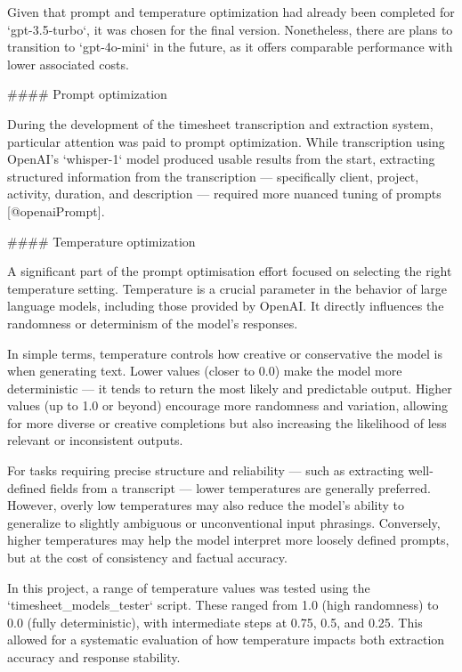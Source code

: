 \documentclass[
  digital,     %
  oneside,     %
  nosansbold,  %
  nocolorbold, %
  lof,         %
  lot,         %
]{fithesis4}
\begin{document}
\shorthandoff{-}
\begin{markdown}

Given that prompt and temperature optimization had already been completed for `gpt-3.5-turbo`, it was chosen for the final version. Nonetheless, there are plans to transition to `gpt-4o-mini` in the future, as it offers comparable performance with lower associated costs.

#### Prompt optimization

During the development of the timesheet transcription and extraction system, particular attention was paid to prompt optimization. While transcription using OpenAI's `whisper-1` model produced usable results from the start, extracting structured information from the transcription — specifically client, project, activity, duration, and description — required more nuanced tuning of prompts [@openaiPrompt].

#### Temperature optimization

A significant part of the prompt optimisation effort focused on selecting the right temperature setting. Temperature is a crucial parameter in the behavior of large language models, including those provided by OpenAI. It directly influences the randomness or determinism of the model's responses.

In simple terms, temperature controls how creative or conservative the model is when generating text. Lower values (closer to 0.0) make the model more deterministic — it tends to return the most likely and predictable output. Higher values (up to 1.0 or beyond) encourage more randomness and variation, allowing for more diverse or creative completions but also increasing the likelihood of less relevant or inconsistent outputs.

For tasks requiring precise structure and reliability — such as extracting well-defined fields from a transcript — lower temperatures are generally preferred. However, overly low temperatures may also reduce the model's ability to generalize to slightly ambiguous or unconventional input phrasings. Conversely, higher temperatures may help the model interpret more loosely defined prompts, but at the cost of consistency and factual accuracy.

In this project, a range of temperature values was tested using the `timesheet_models_tester` script. These ranged from 1.0 (high randomness) to 0.0 (fully deterministic), with intermediate steps at 0.75, 0.5, and 0.25. This allowed for a systematic evaluation of how temperature impacts both extraction accuracy and response stability.

\end{markdown}
\shorthandon{-}
\end{document}
